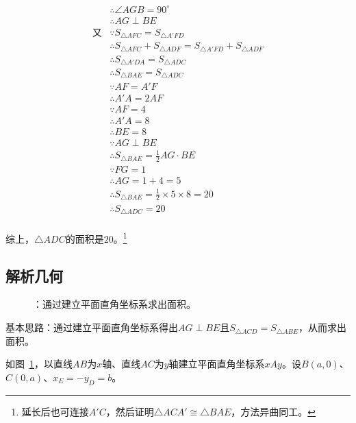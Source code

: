 \begin{align*}
  &\therefore \angle AGB = 90^\circ \\
  &\therefore AG \perp BE \\
  \text{又}&\because S_{\triangle AFC} = S_{\triangle A'FD} \\
  &\therefore S_{\triangle AFC} + S_{\triangle ADF} = S_{\triangle A'FD} + S_{\triangle ADF} \\
  &\therefore S_{\triangle A'DA} = S_{\triangle ADC} \\
  &\therefore S_{\triangle BAE} = S_{\triangle ADC} \\
  &\because   AF = A'F \\
  &\therefore A'A = 2AF \\
  &\because   AF = 4 \\
  &\therefore A'A = 8 \\
  &\therefore BE = 8 \\
  &\because   AG \perp BE \\
  &\therefore S_{\triangle BAE} = \frac12AG\cdot BE \\
  &\because   FG = 1 \\
  &\therefore AG = 1 + 4 = 5 \\
  &\therefore S_{\triangle BAE} = \frac12\times5\times8 = 20 \\
  &\therefore S_{\triangle ADC} = 20 \\
\end{align*}

综上，$\triangle ADC$的面积是$20$。\footnote{延长后也可连接$A'C$，然后证明$\triangle ACA' \cong \triangle BAE$，方法异曲同工。}

\subsection{解析几何} \label{subsec:0017-dec}

\begin{figure}[htbp]
  \centering
  \caption{：通过建立平面直角坐标系求出面积。}
  \label{fig:0017-dec}
\end{figure}

基本思路：通过建立平面直角坐标系得出$AG \perp BE$且$S_{\triangle ACD} = S_{\triangle ABE}$，从而求出面积。

如图~\ref{fig:0017-dec}，以直线$AB$为$x$轴、直线$AC$为$y$轴建立平面直角坐标系$xAy$。设$B(a,0)$、$C(0,a)$、$x_E = -y_D = b$。

